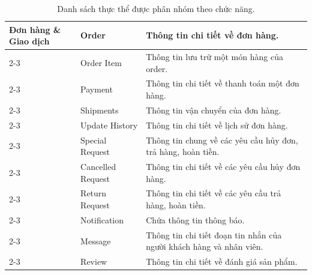 \begin{table}[H]
\begin{tabular}{|m{3cm}|m{3.5cm}|m{9.5cm}|}
		\multirow{8}{=}{\textbf{Đơn hàng \& Giao dịch}}
		                   & Order                 & Thông tin chi tiết về đơn hàng.                                                                                                      \\ \cline{2-3}
		                   & Order Item            & Thông tin lưu trữ một món hàng của order.                                                                                            \\ \cline{2-3}
		                   & Payment               & Thông tin chi tiết về thanh toán một đơn hàng.                                                                                       \\ \cline{2-3}
		                   & Shipments             & Thông tin vận chuyển của đơn hàng.                                                                                                   \\ \cline{2-3}
		                   & Update History        & Thông tin chi tiết về lịch sử đơn hàng.                                                                                              \\ \cline{2-3}
		                   & Special Request       & Thông tin chung về các yêu cầu hủy đơn, trả hàng, hoàn tiền.                                                                         \\
		\cline{2-3}
		                   & Cancelled Request     & Thông tin chi tiết về các yêu cầu hủy đơn hàng.                                                                                      \\
		\cline{2-3}
		                   & Return Request        & Thông tin chi tiết về các yêu cầu trả hàng, hoàn tiền.                                                                               \\
		\cline{2-3}

		\hline

		\multirow{3}{=}{\textbf{Tương tác}}
		                   & Notification          & Chứa thông tin thông báo.                                                                                                            \\ \cline{2-3}
		                   & Message               & Thông tin chi tiết đoạn tin nhắn của người khách hàng và nhân viên.                                                                  \\ \cline{2-3}
		                   & Review                & Thông tin chi tiết về đánh giá sản phẩm.                                                                                             \\ \hline
	\end{tabular}
	\caption{Danh sách thực thể được phân nhóm theo chức năng.}
	\label{tab:mInfoGrouped}
\end{table}

